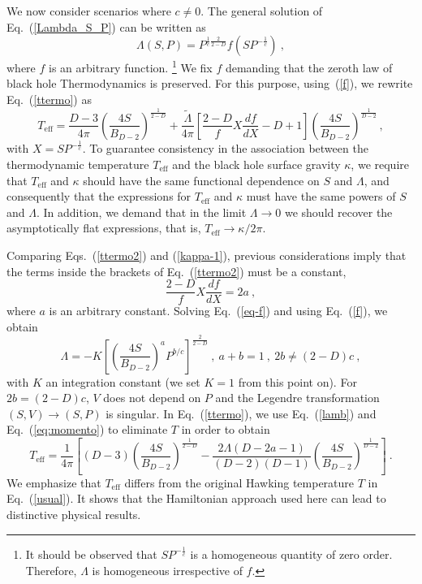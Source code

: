 \documentclass[prd,onecolumn,notitlepage,amsmath,nofootinbib,superscriptaddress,showpacs,showkeys]{revtex4-1}
\begin{document}
We now consider scenarios where $c\neq0$. The general solution of
Eq.~(\ref{Lambda_S_P}) can be written as 
\begin{equation}
\Lambda\left(S,P\right)=P^{\frac{1}{c}\frac{2}{2-D}}f\left(SP^{-\frac{1}{c}}\right)~,
\label{f}
\end{equation}
where $f$ is an arbitrary function.%
\footnote{It should be observed that $SP^{-\frac{1}{c}}$ is a homogeneous quantity
of zero order. Therefore, $\Lambda$ is homogeneous irrespective of
$f$.%
}
%
We fix $f$ demanding that the zeroth law of black hole Thermodynamics
is preserved.
%
For this purpose, using~(\ref{f}), we rewrite Eq.~(\ref{ttermo}) as
%
\begin{equation}
T_{\mathrm{eff}}=\frac{D-3}{4\pi}\left(  \frac{4S}{B_{D-2}}\right)  ^{\frac
{1}{2-D}}+\frac{\tilde{\Lambda}}{4\pi}\left[  \frac{2-D}{f}X\frac{df}%
{dX}-D+1\right]  \left(  \frac{4S}{B_{D-2}}\right)  ^{\frac{1}{D-2}%
}\,,\label{ttermo2}%
\end{equation}
%
with $X=SP^{-\frac{1}{c}}$. To guarantee consistency in the
association between the thermodynamic temperature $T_{\mathrm{eff}}$ and the
black hole surface gravity $\kappa$, we require that $T_{\mathrm{eff}}$ and
$\kappa$ should have the same functional dependence on $S$ and $\Lambda$, and
consequently that the expressions for $T_{\mathrm{eff}}$ and $\kappa$ must
have the same powers of $S$ and $\Lambda$. In addition, we demand that in the
limit $\Lambda\rightarrow0$ we should recover the asymptotically flat
expressions, that is, $T_{\mathrm{eff}}\rightarrow\kappa/2\pi$. 

Comparing Eqs.~(\ref{ttermo2}) and (\ref{kappa-1}), previous
considerations imply that the terms inside the brackets of Eq.~(\ref{ttermo2})
must be a constant, 
%
\begin{equation}
\frac{2-D}{f}X\frac{df}{dX}=2a~,\label{eq-f}%
\end{equation}
%
where $a$ is an arbitrary constant. Solving Eq.~(\ref{eq-f}) and using Eq.~(\ref{f}), we obtain
%
\begin{equation}
\Lambda = -K\left[  \left(  \frac{4S}{B_{D-2}}\right)  ^{a}P^{b/c}\right]
^{\frac{2}{2-D}}~,\ a+b=1~,\ 2b\neq\left(  2-D\right)  c ~,
\label{lamb}%
\end{equation}
%
with $K$ an integration constant (we set $K=1$ from this point on). 
%
For $2b=\left(2-D\right)c$, $V$ does not depend on $P$ and the
Legendre transformation $\left(S,V\right)\rightarrow\left(S,P\right)$
is singular. In Eq.~(\ref{ttermo}), we use Eq.~(\ref{lamb}) and
Eq.~(\ref{eq:momento}) to eliminate $T$ in order to obtain 
\begin{equation}
T_{\mathrm{eff}}=\frac{1}{4\pi}\left[\left(D-3\right)\left(\frac{4S}{B_{D-2}}\right)^{\frac{1}{2-D}}-\frac{2\Lambda\left(D-2a-1\right)}{\left(D-2\right)\left(D-1\right)}\left(\frac{4S}{B_{D-2}}\right)^{\frac{1}{D-2}}\right]~.\label{teff}
\end{equation}
%
We emphasize that  $T_{\mathrm{eff}}$ differs from the original Hawking temperature $T$ in Eq.~(\ref{usual}). It shows that the Hamiltonian approach used here can lead to distinctive physical results.
\end{document}
